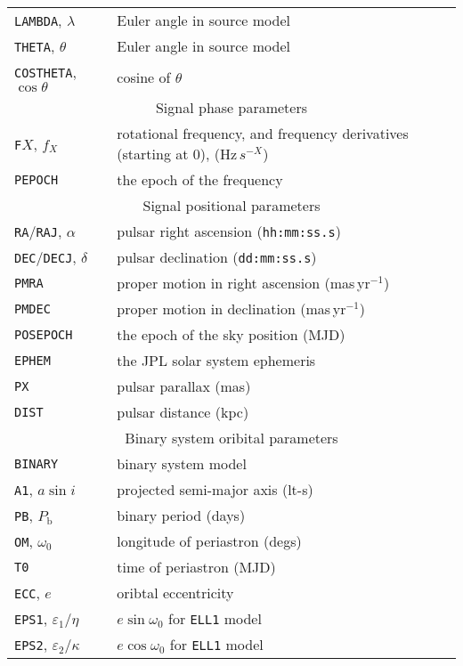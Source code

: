 \begin{longtable}{l|l}
{\tt LAMBDA}, $\lambda$ & Euler angle in source model \citep[see][]{2015MNRAS.453.4399P} \\
{\tt THETA}, $\theta$ & Euler angle in source model \citep[see][]{2015MNRAS.453.4399P} \\
{\tt COSTHETA}, $\cos{\theta}$ & cosine of $\theta$ \\
\hline
\multicolumn{2}{c}{Signal phase parameters} \\
\hline
{\tt F}$X$, $f_X$ & rotational frequency, and frequency derivatives (starting at 0), (Hz$\,s^{-X}$) \\
{\tt PEPOCH} & the epoch of the frequency \\
\hline
\multicolumn{2}{c}{Signal positional parameters} \\
\hline
{\tt RA}/{\tt RAJ}, $\alpha$ & pulsar right ascension ({\tt hh:mm:ss.s}) \\
{\tt DEC}/{\tt DECJ}, $\delta$ & pulsar declination ({\tt dd:mm:ss.s}) \\
{\tt PMRA} & proper motion in right ascension (mas\,yr$^{-1}$) \\
{\tt PMDEC} & proper motion in declination (mas\,yr$^{-1}$) \\
{\tt POSEPOCH} & the epoch of the sky position (MJD) \\
{\tt EPHEM} & the JPL solar system ephemeris \\
{\tt PX} & pulsar parallax (mas) \\
{\tt DIST} & pulsar distance (kpc) \\
\hline
\multicolumn{2}{c}{Binary system oribital parameters} \\
\hline
{\tt BINARY} & binary system model \citep[see e.g.][and references therein]{1989ApJ...345..434T} \\
{\tt A1}, $a\sin{i}$ & projected semi-major axis (lt-s) \\
{\tt PB}, $P_{\text{b}}$ & binary period (days) \\
{\tt OM}, $\omega_0$ & longitude of periastron (degs) \\
{\tt T0} & time of periastron (MJD) \\
{\tt ECC}, $e$ & oribtal eccentricity \\
{\tt EPS1}, $\varepsilon_1$/$\eta$ & $e\sin{\omega_0}$ for {\tt ELL1} model \citep[see Appendix in][]{2001MNRAS.326..274L} \\
{\tt EPS2}, $\varepsilon_2$/$\kappa$ & $e\cos{\omega_0}$ for {\tt ELL1} model \citep[see Appendix in][]{2001MNRAS.326..274L} \\

\end{longtable}
